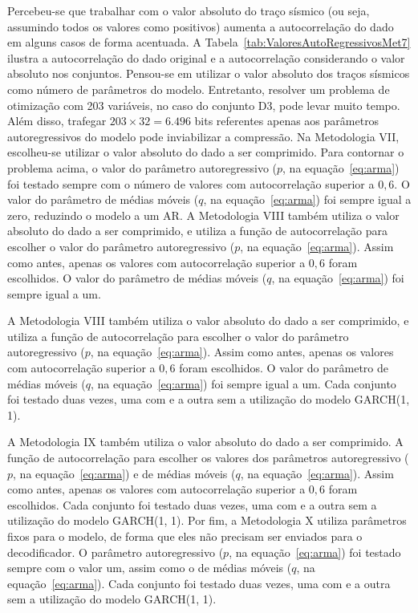 Percebeu-se que trabalhar com o valor absoluto do traço sísmico (ou seja,
assumindo todos os valores como positivos) aumenta a autocorrelação do dado em
alguns casos de forma acentuada. A Tabela~\ref{tab:ValoresAutoRegressivosMet7}
ilustra a autocorrelação do dado original e a autocorrelação considerando o valor
absoluto nos conjuntos. Pensou-se em utilizar o valor absoluto dos traços
sísmicos como número de parâmetros do modelo. Entretanto, resolver um problema
de otimização com 203 variáveis, no caso do conjunto D3, pode levar muito
tempo. Além disso, trafegar $203 \times 32 = 6.496$ bits referentes apenas aos
parâmetros autoregressivos do modelo pode inviabilizar a compressão. Na
Metodologia VII, escolheu-se utilizar o valor absoluto do dado a ser
comprimido. Para contornar o problema acima, o valor do parâmetro
autoregressivo ($p$, na equação~\ref{eq:arma}) foi testado sempre com o número
de valores com autocorrelação superior a $0,6$. O valor do parâmetro de médias
móveis ($q$, na equação~\ref{eq:arma}) foi sempre igual a zero, reduzindo o
modelo a um AR. A Metodologia VIII também utiliza o valor absoluto do dado a ser
comprimido, e utiliza a função de autocorrelação para escolher o valor do
parâmetro autoregressivo ($p$, na equação~\ref{eq:arma}). Assim como antes,
apenas os valores com autocorrelação superior a $0,6$ foram escolhidos. O valor
do parâmetro de médias móveis ($q$, na equação~\ref{eq:arma}) foi sempre igual a
um.

A Metodologia VIII também utiliza o valor absoluto do dado a ser
comprimido, e utiliza a função de autocorrelação para escolher o valor do
parâmetro autoregressivo ($p$, na equação~\ref{eq:arma}). Assim como antes,
apenas os valores com autocorrelação superior a $0,6$ foram escolhidos. O valor do parâmetro de
médias móveis ($q$, na equação~\ref{eq:arma}) foi sempre igual a um. Cada
conjunto foi testado duas vezes, uma com e a outra sem a utilização do modelo GARCH(1, 1).

A Metodologia IX também utiliza o valor absoluto do dado a ser
comprimido. A função de autocorrelação para escolher os valores dos
parâmetros autoregressivo ($p$, na equação~\ref{eq:arma}) e de médias móveis
($q$, na equação~\ref{eq:arma}). Assim como antes, apenas os valores com
autocorrelação superior a $0,6$ foram escolhidos. Cada conjunto foi testado duas
vezes, uma com e a outra sem a utilização do modelo GARCH(1, 1). Por fim, a
Metodologia X utiliza parâmetros fixos para o modelo, de forma que eles não
precisam ser enviados para o decodificador. O parâmetro autoregressivo ($p$, na
equação~\ref{eq:arma}) foi testado sempre com o valor um, assim como o de
médias móveis ($q$, na equação~\ref{eq:arma}). Cada conjunto foi testado duas
vezes, uma com e a outra sem a utilização do modelo GARCH(1, 1).

